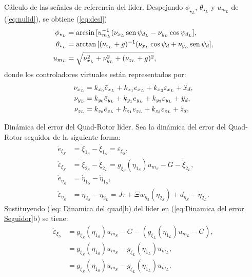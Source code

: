\documentclass[hyperref={pdfpagelabels=false}]{beamer}
\begin{document}
\begin{frame}{Cálculo de las señales de referencia del líder.} 
Despejando $\phi_{\star_L}$, $\theta_{\star_L}$ y $u_{m_L}$ de (\ref{eq:nulid}), se obtiene (\ref{eq:desl})
\begin{subequations}
  \begin{align}
    \phi_{\star_L} &= \arcsin{[u_{m_L}^{-1}(\nu_{x_L} \operatorname{sen}{\psi_{d_L}} - \nu_{y_L} \cos{\psi_{d_L} }]}, \\
    \theta_{\star_L} &= \arctan{[(\nu_{z_L} + g )^{-1}(\nu_{x_L} \cos{\psi_{d}} + \nu_{y_L} \operatorname{sen}{\psi_{d} }]}, \\
    u_{m_L} & = \sqrt{\nu_{x_L}^2+\nu_{y_L}^2+ (\nu_{z_L}+g)^2},
    \end{align}
  \label{eq:desl}
\end{subequations}
donde los controladores virtuales están representados por:
\begin{subequations}
  \begin{align}
    \nu_{x_L} &=k_{x_0}\Bar{e}_{x_L}+ k_{x_1}e_{x_L} + k_{x_3}\varepsilon_{x_L} + \ddot x_{d} ,\\
    \nu_{y_L} &=k_{y_0}\Bar{e}_{y_L}+ k_{y_1}e_{y_L} + k_{y_3}\varepsilon_{y_L}  + \ddot y_{d},\\
    \nu_{z_L} &= k_{z_0}\Bar{e}_{z_L}+ k_{z_1}e_{z_L} + k_{z_3}\varepsilon_{z_L} + \ddot z_{d} ,
    \end{align}
  \label{eq:cv2}
\end{subequations}
\end{frame}


\begin{frame}{Dinámica del error del Quad-Rotor l\'ider.} 
Sea la dinámica del error del Quad-Rotor seguidor de la siguiente forma:
\begin{subequations}
  \begin{align}
	\dot{e}_{\xi_S}            &= \dot{\xi}_{1_S}  - \dot{\xi}_{1_S}  = \varepsilon_{\xi_S},\\ 
	\dot{\varepsilon}_{\xi_S}  &= \dot{\xi}_{2_S}  - \dot{\xi}_{2_L}  = g_{\xi_{S}}(\eta_{1_S})u_{m_S}-G-\dot{\xi}_{2_L},\\ 
	\dot{e}_{\eta_S}           &= \dot{\eta}_{1_S} - \dot{\eta}_{1_S},\\ 
	\dot{\varepsilon}_{\eta_S} &= \dot{\eta}_{2_S} - \dot{\eta}_{2_L} = J\tau+\Xi w_{\eta_2}(\eta_{2_S})+d_{\eta_S} -\dot{\eta}_{2_L}.
  \end{align}\label{eq:Dinamica del error Seguidor}
\end{subequations}
Sustituyendo (\ref{eq: Dinamica del quad}b) del líder en (\ref{eq:Dinamica del error Seguidor}b) se tiene: 
\begin{subequations}
  \begin{align}
    \dot{\varepsilon}_{\xi_S}  &=  g_{\xi_{S}}(\eta_{1_S})u_{m_S}-G-(g_{\xi_{L}}(\eta_{1_L})u_{m_L}-G),\\ 
     &=  g_{\xi_{S}}(\eta_{1_S})u_{m_S}-g_{\xi_{L}}(\eta_{1_L})u_{m_L},\\ 
     &=  g_{\xi_{S}}(\eta_{1_S})u_{m_S}-g_{\xi_{L}}(\eta_{1_L})u_{m_L}.
  \end{align}\label{eq:diner}
\end{subequations}
\end{frame}
\end{document}
